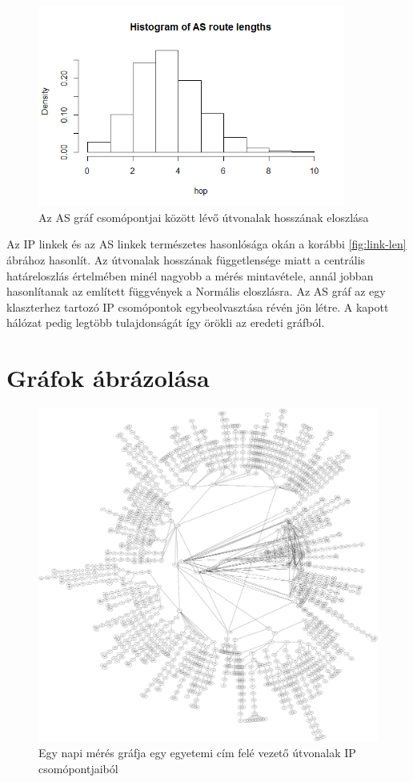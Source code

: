 \begin{figure}[h!]
	\centering
	\includegraphics[width=0.9\textwidth, keepaspectratio]{figures/as-hop-hist.png}
	\caption{Az AS gráf csomópontjai között lévő útvonalak hosszának eloszlása}
	\label{fig:as-route-len}
\end{figure}

Az IP linkek és az AS linkek természetes hasonlósága okán a korábbi \ref{fig:link-len} ábrához hasonlít. Az útvonalak hosszának függetlensége miatt a centrális határeloszlás értelmében minél nagyobb a mérés mintavétele, annál jobban hasonlítanak az említett függvények a Normális eloszlásra. Az AS gráf az egy \glqq klaszterhez \grqq tartozó IP csomópontok egybeolvasztása révén jön létre. A kapott hálózat pedig legtöbb tulajdonságát így örökli az eredeti gráfból.


\section{Gráfok ábrázolása}

\begin{figure}[!h]
	\centering
	\includegraphics[width=1\textwidth, keepaspectratio]{figures/graph.png}
	\caption{Egy napi mérés gráfja egy egyetemi cím felé vezető útvonalak IP csomópontjaiból\label{fig:graph}}
\end{figure}

